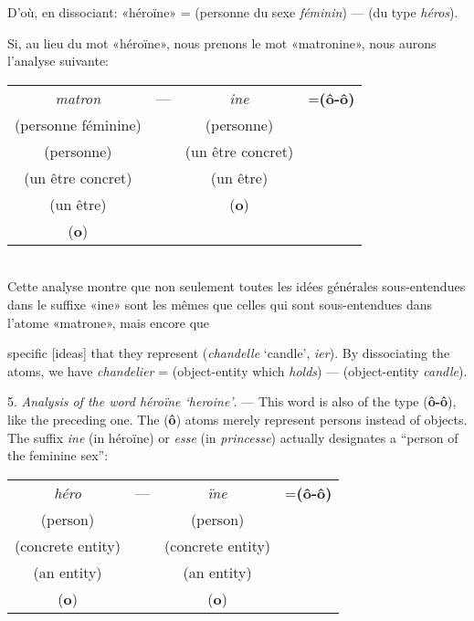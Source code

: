 \begin{sloppypar}
{  D’où, en dissociant: «héroïne» = (personne du sexe \emph{féminin}) —
  (du type \emph{héros}).

  Si, au lieu du mot «héroïne», nous prenons le mot «matronine», nous
  aurons l’analyse suivante: \\[1ex]

  \noindent
  {\setlength{\tabcolsep}{0pt} {\small
      \begin{tabular}[t]{cccc}
        \emph{matron}&{---}&\emph{ine}&\hspace{-1em}=\textbf{(ô-ô)}\\
        (personne féminine) &&(personne)\\
        (personne)&&(un être concret)\\
        (un être concret)&&(un être)\\
        (un être)&&(\textbf{o})\\
        (\textbf{o})
      \end{tabular}}}
  \\[1ex]

  Cette analyse montre que non seulement toutes les idées générales
  sous-entendues dans le suffixe «ine» sont les mêmes que celles qui
  sont sous-entendues dans l’atome «matrone», mais encore que


}
%
{\noindent
  specific [ideas] that they represent (\emph{chandelle} `candle',
  \emph{ier}). By dissociating the atoms, we have \emph{chandelier} =
  (object-entity which \emph{holds}) --- (object-entity
  \emph{candle}).

  5. \emph{Analysis of the word \emph{héroïne} `heroine'}. --- This word is
  also of the type (\textbf{ô-ô}), like the preceding one. The
  (\textbf{ô}) atoms merely represent persons instead of
  objects. The suffix \emph{ine} (in héroïne) or \emph{esse} (in
  \emph{princesse}) actually designates a ``person of the feminine sex'':\\[1ex]

  \noindent
  {\setlength{\tabcolsep}{0pt} {\small
      \begin{tabular}[t]{cccc}
        \emph{héro}&{---}&\emph{ïne}&=\textbf{(ô-ô)}\\
        (person)&&(person)\\
        (concrete entity)&&(concrete entity)\\
        (an entity)&&(an entity)\\
        (\textbf{o})&&(\textbf{o})
      \end{tabular}}}
  \\[1ex]

}
\end{sloppypar}

